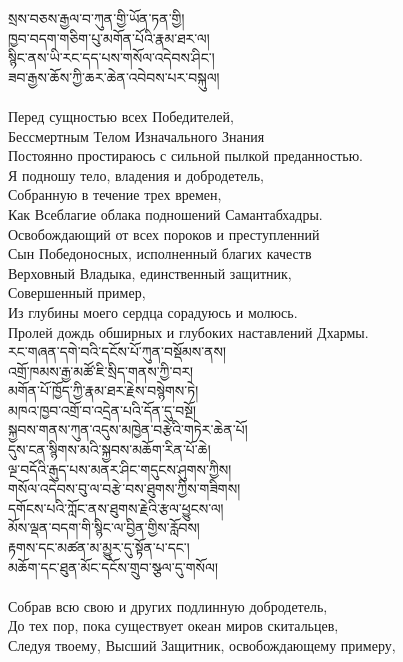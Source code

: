 སྲས་བཅས་རྒྱལ་བ་ཀུན་གྱི་ཡོན་ཏན་གྱི།\\
ཁྱབ་བདག་གཅིག་པུ་མགོན་པོའི་རྣམ་ཐར་ལ།\\
སྙིང་ནས་ཡི་རང་དད་པས་གསོལ་འདེབས་ཤིང་།\\
ཟབ་རྒྱས་ཆོས་ཀྱི་ཆར་ཆེན་འབེབས་པར་བསྐུལ། \\
\\
\ru
Перед сущностью всех Победителей, \\
Бессмертным Телом Изначального Знания \\
Постоянно простираюсь с сильной пылкой преданностью. \\
Я подношу тело, владения и добродетель, \\
Собранную в течение трех времен, \\
Как Всеблагие облака подношений Самантабхадры. \\
Освобождающий от всех пороков и преступленний \\
Сын Победоносных, исполненный благих качеств \\
Верховный Владыка, единственный защитник, \\
Совершенный пример, \\
Из глубины моего сердца сорадуюсь и молюсь. \\
Пролей дождь обширных и глубоких наставлений Дхармы. \\
\newpage
\ti
རང་གཞན་དགེ་བའི་དངོས་པོ་ཀུན་བསྡོམས་ནས།\\
འགྲོ་ཁམས་རྒྱ་མཚོ་ཇི་སྲིད་གནས་ཀྱི་བར།\\
མགོན་པོ་ཁྱོད་ཀྱི་རྣམ་ཐར་རྗེས་བསྙེགས་ཏེ།\\
མཁའ་ཁྱབ་འགྲོ་བ་འདྲེན་པའི་དོན་དུ་བསྔོ།\\
སྐྱབས་གནས་ཀུན་འདུས་མཁྱེན་བརྩེའི་གཏེར་ཆེན་པོ།\\
དུས་ངན་སྙིགས་མའི་སྐྱབས་མཆོག་རིན་པོ་ཆེ།\\
ལྔ་བདོའི་རྒུད་པས་མནར་ཤིང་གདུངས་ཤུགས་ཀྱིས།\\
གསོལ་འདེབས་བུ་ལ་བརྩེ་བས་ཐུགས་ཀྱིས་གཟིགས། \\
དགོངས་པའི་ཀློང་ནས་ཐུགས་རྗེའི་རྩལ་ཕྱུངས་ལ།\\
མོས་ལྡན་བདག་གི་སྙིང་ལ་བྱིན་གྱིས་རློབས།\\
རྟགས་དང་མཚན་མ་མྱུར་དུ་སྟོན་པ་དང་།\\
མཆོག་དང་ཐུན་མོང་དངོས་གྲུབ་སྩལ་དུ་གསོལ།\\
\\
\ru
Собрав всю свою и других подлинную добродетель, \\
До тех пор, пока существует океан миров скитальцев, \\
Следуя твоему, Высший Защитник, освобождающему примеру, \\
